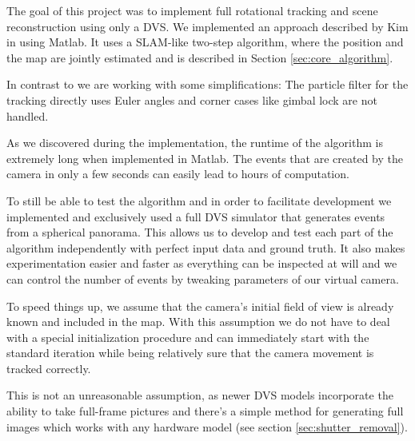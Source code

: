 The goal of this project was to implement full rotational tracking and scene
reconstruction using only a DVS. We implemented an approach described by Kim \etal
in \cite{kim2014simultaneous} using Matlab. It uses a SLAM-like two-step
algorithm, where the position and the map are jointly estimated and is
described in Section \ref{sec:core_algorithm}.

In contrast to \cite{kim2014simultaneous} we are working with some
simplifications: The particle filter for the tracking directly uses Euler
angles and corner cases like gimbal lock are not handled.

As we discovered during the implementation, the runtime of the algorithm is
extremely long when implemented in Matlab. The events that are created by the
camera in only a few seconds can easily lead to hours of computation.

To still be able to test the algorithm and in order to facilitate development
we implemented and exclusively used a full DVS simulator that generates events
from a spherical panorama.  This allows us to develop and test each part of the
algorithm independently with perfect input data and ground truth. It also makes
experimentation easier and faster as everything can be inspected at will and we can
control the number of events by tweaking parameters of our virtual camera.

To speed things up, we assume that the camera's initial field
of view is already known and included in the map. With this assumption we do
not have to deal with a special initialization procedure and can immediately
start with the standard iteration while being relatively sure that the camera
movement is tracked correctly.

This is not an unreasonable assumption, as newer DVS models incorporate the
ability to take full-frame pictures and there's a simple method for generating
full images which works with any hardware model (see section
\ref{sec:shutter_removal}).
